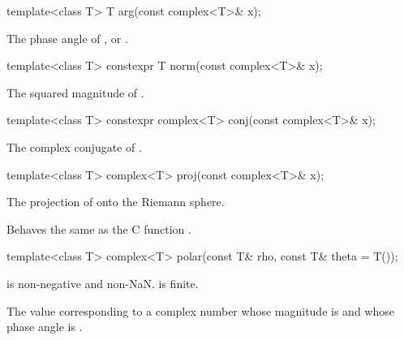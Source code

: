 %
\begin{itemdecl}
template<class T> T arg(const complex<T>& x);
\end{itemdecl}

\begin{itemdescr}
\pnum
\returns
The phase angle of , or .
\end{itemdescr}

%
\begin{itemdecl}
template<class T> constexpr T norm(const complex<T>& x);
\end{itemdecl}

\begin{itemdescr}
\pnum
\returns
The squared magnitude of .
\end{itemdescr}

%
\begin{itemdecl}
template<class T> constexpr complex<T> conj(const complex<T>& x);
\end{itemdecl}

\begin{itemdescr}
\pnum
\returns
The complex conjugate of .
\end{itemdescr}

%
\begin{itemdecl}
template<class T> complex<T> proj(const complex<T>& x);
\end{itemdecl}

\begin{itemdescr}
\pnum
\returns
The projection of  onto the Riemann sphere.

\pnum
\remarks
Behaves the same as the C function .
\end{itemdescr}

%
\begin{itemdecl}
template<class T> complex<T> polar(const T& rho, const T& theta = T());
\end{itemdecl}

\begin{itemdescr}
\pnum
\expects
{} is non-negative and non-NaN\@.  is finite.

\pnum
\returns
The
value corresponding
to a complex number whose magnitude is  and whose phase angle
is .
\end{itemdescr}


